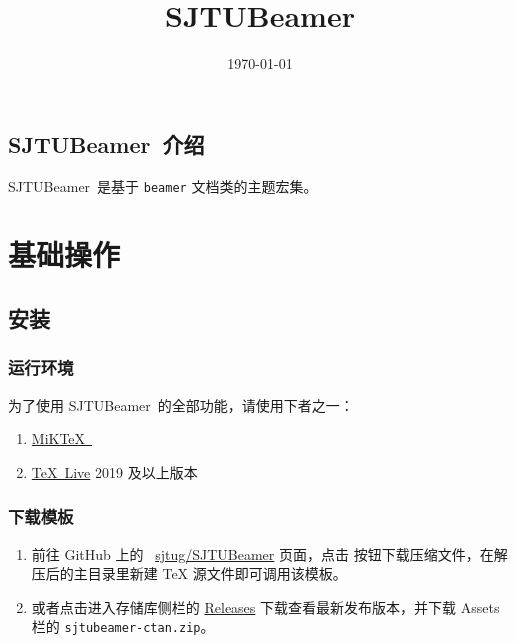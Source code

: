 \documentclass[
    UTF8,
    heading=true,
    12pt,
    a4paper
]{ctexrep}
\def\themename{\textsf{SJTUBeamer}}
\begin{document}
    \title{\themename}
    \date{\today}

    \chapter*{\themename\ 介绍}

    \themename\ 是基于 \texttt{beamer} 文档类的主题宏集。

    \setcounter{tocdepth}{0}
    \tableofcontents

    \part{基础操作}
    \chapter{安装}

    \section{运行环境}

    为了使用 \themename\ 的全部功能，请使用下者之一：
    \begin{enumerate}
        \item \href{https://miktex.org/}{MiK\TeX\ }
        \item \href{https://mirrors.sjtug.sjtu.edu.cn/ctan/systems/texlive/Images/texlive2021-20210325.iso}{\TeX\ Live} 2019 及以上版本
    \end{enumerate}

    \section{下载模板}

    \begin{enumerate}
        \item 前往 GitHub 上的 \faGithub{}~\href{https://github.com/sjtug/SJTUBeamer}{sjtug/SJTUBeamer} 页面，点击  按钮下载压缩文件，在解压后的主目录里新建 \TeX{} 源文件即可调用该模板。
        \item 或者点击进入存储库侧栏的 \href{https://github.com/sjtug/SJTUBeamer/releases}{\textsf{Releases}} 下载查看最新发布版本，并下载 \textsf{Assets} 栏的 \texttt{sjtubeamer-ctan.zip}。
    \end{enumerate}
    
\end{document}
